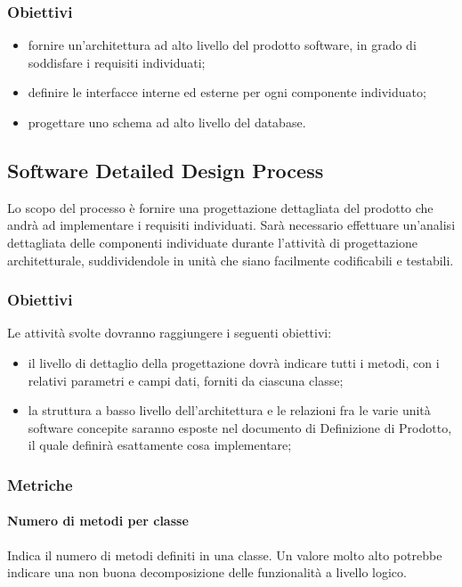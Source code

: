 		\subsubsection{Obiettivi}
			\begin{itemize}
				\item fornire un'architettura ad alto livello del prodotto software, in grado di soddisfare i requisiti individuati;
				\item definire le interfacce interne ed esterne per ogni componente individuato;
				\item progettare uno schema ad alto livello del database. 
			\end{itemize}
	
	\subsection{Software Detailed Design Process}
	Lo scopo del processo è fornire una progettazione dettagliata del prodotto che andrà ad implementare i requisiti individuati.
	Sarà necessario effettuare un’analisi dettagliata delle componenti individuate durante l'attività di progettazione
	architetturale, suddividendole in unità che siano facilmente codificabili e testabili.
		\subsubsection{Obiettivi}
		Le attività svolte dovranno raggiungere i seguenti obiettivi:
		\begin{itemize}
			\item il livello di dettaglio della progettazione dovrà indicare tutti i metodi, con i relativi parametri e campi dati, forniti da ciascuna classe;
			\item la struttura a basso livello dell’architettura e le relazioni fra le varie unità software concepite saranno esposte nel documento di Definizione di Prodotto, il quale definirà esattamente cosa implementare;
		\end{itemize}
		
		\subsubsection{Metriche}
			\paragraph{Numero di metodi per classe}
			Indica il numero di metodi definiti in una classe.
			Un valore molto alto potrebbe indicare una
			non buona decomposizione delle funzionalità a livello logico.
			
